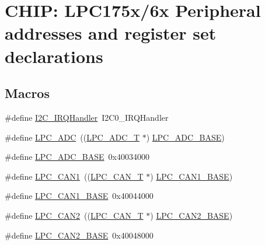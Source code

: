 \hypertarget{group__PERIPH__175X__6X__BASE}{}\section{C\+H\+IP\+: L\+P\+C175x/6x Peripheral addresses and register set declarations}
\label{group__PERIPH__175X__6X__BASE}
\subsection*{Macros}
\begin{DoxyCompactItemize}
\item 
\#define \hyperlink{group__PERIPH__175X__6X__BASE_ga78bc9c1986ea5da20688e1db532c5717}{I2\+C\+\_\+\+I\+R\+Q\+Handler}~I2\+C0\+\_\+\+I\+R\+Q\+Handler
\item 
\#define \hyperlink{group__PERIPH__175X__6X__BASE_gab6eaf639d3a1eec83583a9e11ab7336f}{L\+P\+C\+\_\+\+A\+DC}~((\hyperlink{structLPC__ADC__T}{L\+P\+C\+\_\+\+A\+D\+C\+\_\+T}              $\ast$) \hyperlink{group__PERIPH__407X__8X__BASE_ga2396e0d0c565e4c1c3b2fc593bd6c37f}{L\+P\+C\+\_\+\+A\+D\+C\+\_\+\+B\+A\+SE})
\item 
\#define \hyperlink{group__PERIPH__175X__6X__BASE_ga2396e0d0c565e4c1c3b2fc593bd6c37f}{L\+P\+C\+\_\+\+A\+D\+C\+\_\+\+B\+A\+SE}~0x40034000
\item 
\#define \hyperlink{group__PERIPH__175X__6X__BASE_ga2f006d6888921f8336dce504eb56f4aa}{L\+P\+C\+\_\+\+C\+A\+N1}~((\hyperlink{structLPC__CAN__T}{L\+P\+C\+\_\+\+C\+A\+N\+\_\+T}              $\ast$) \hyperlink{group__PERIPH__407X__8X__BASE_gaf2407c1927ebddd767832aefa74c3398}{L\+P\+C\+\_\+\+C\+A\+N1\+\_\+\+B\+A\+SE})
\item 
\#define \hyperlink{group__PERIPH__175X__6X__BASE_gaf2407c1927ebddd767832aefa74c3398}{L\+P\+C\+\_\+\+C\+A\+N1\+\_\+\+B\+A\+SE}~0x40044000
\item 
\#define \hyperlink{group__PERIPH__175X__6X__BASE_ga838776140ad5e0156715278f8bb0652d}{L\+P\+C\+\_\+\+C\+A\+N2}~((\hyperlink{structLPC__CAN__T}{L\+P\+C\+\_\+\+C\+A\+N\+\_\+T}              $\ast$) \hyperlink{group__PERIPH__407X__8X__BASE_gab9608b3b72dd843a25910dd2a809106b}{L\+P\+C\+\_\+\+C\+A\+N2\+\_\+\+B\+A\+SE})
\item 
\#define \hyperlink{group__PERIPH__175X__6X__BASE_gab9608b3b72dd843a25910dd2a809106b}{L\+P\+C\+\_\+\+C\+A\+N2\+\_\+\+B\+A\+SE}~0x40048000
\item 

\end{DoxyCompactItemize}
